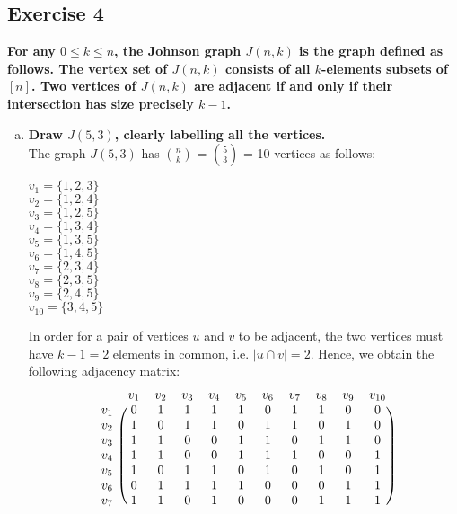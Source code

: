 \subsection*{Exercise 4}
\boldmath
\textbf{For any $0 \leq k \leq n$, the Johnson graph $J(n, k)$ is the graph defined as follows. The vertex set of
$J(n, k)$ consists of all $k$-elements subsets of $[n]$. Two vertices of $J(n, k)$ are adjacent if and only
if their intersection has size precisely $k-1$.} 
\begin{enumerate}[a)]
    \item \textbf{Draw $J(5, 3)$, clearly labelling all the vertices.} 
    \unboldmath
    \\
    \linebreak 
    The graph $J(5,3)$ has $\binom{n}{k}$ = $\binom{5}{3}$ = 10 vertices as follows: 
    \begin{multicols}{2}
    $v_1 = \{1, 2, 3\}$ \\
    $v_2 = \{1, 2, 4\}$ \\
    $v_3 = \{1, 2, 5\}$ \\
    $v_4 = \{1, 3, 4\}$ \\
    $v_5 = \{1, 3, 5\}$ \\
    $v_6 = \{1, 4, 5\}$ \\
    $v_7 = \{2, 3, 4\}$ \\
    $v_8 = \{2, 3, 5\}$ \\
    $v_9 = \{2, 4, 5\}$ \\
    $v_{10} = \{3, 4, 5\}$ 
    \end{multicols}
    In order for a pair of vertices $u$ and $v$ to be adjacent, the two vertices must have $k-1 = 2$ elements in common, i.e. $|u \cap v| = 2$. Hence, we obtain the following adjacency matrix:
    \[
\begin{blockarray}{ccccccccccc}
& v_1 & v_2 & v_3 & v_4 & v_5 & v_6 & v_7 & v_8 & v_9 & v_{10}\\
\begin{block}{c(cccccccccc)}
  v_1 & 0 & 1 & 1 & 1 & 1 & 0 & 1 & 1 & 0 & 0 \\
  v_2 & 1 & 0 & 1 & 1 & 0 & 1 & 1 & 0 & 1 & 0 \\
  v_3 & 1 & 1 & 0 & 0 & 1 & 1 & 0 & 1 & 1 & 0 \\
  v_4 & 1 & 1 & 0 & 0 & 1 & 1 & 1 & 0 & 0 & 1 \\
  v_5 & 1 & 0 & 1 & 1 & 0 & 1 & 0 & 1 & 0 & 1 \\
  v_6 & 0 & 1 & 1 & 1 & 1 & 0 & 0 & 0 & 1 & 1 \\
  v_7 & 1 & 1 & 0 & 1 & 0 & 0 & 0 & 1 & 1 & 1 \\

\end{block}
\end{blockarray}\]
\end{enumerate}

